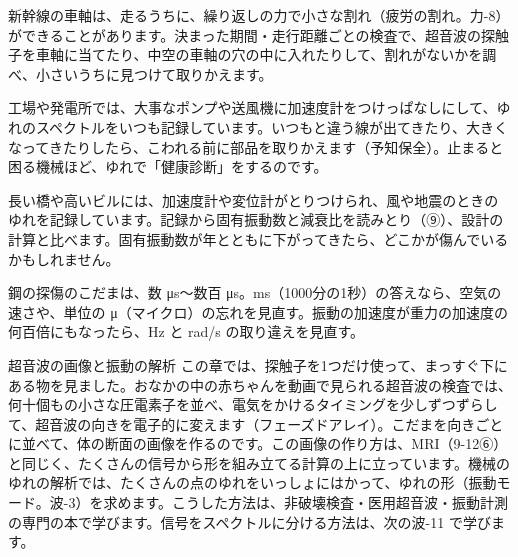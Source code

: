 \begin{phkougaku}
新幹線の車軸は、走るうちに、繰り返しの力で小さな割れ（疲労の割れ。力-8）ができることがあります。決まった期間・走行距離ごとの検査で、超音波の探触子を車軸に当てたり、中空の車軸の穴の中に入れたりして、割れがないかを調べ、小さいうちに見つけて取りかえます。

工場や発電所では、大事なポンプや送風機に加速度計をつけっぱなしにして、ゆれのスペクトルをいつも記録しています。いつもと違う線が出てきたり、大きくなってきたりしたら、こわれる前に部品を取りかえます（予知保全）。止まると困る機械ほど、ゆれで「健康診断」をするのです。

長い橋や高いビルには、加速度計や変位計がとりつけられ、風や地震のときのゆれを記録しています。記録から固有振動数と減衰比を読みとり（⑨）、設計の計算と比べます。固有振動数が年とともに下がってきたら、どこかが傷んでいるかもしれません。
\begin{phketa}[超音波と振動の数の目安]
鋼の探傷のこだまは、数 \si{\micro s}〜数百 \si{\micro s}。ms（1000分の1秒）の答えなら、空気の速さや、単位の μ（マイクロ）の忘れを見直す。振動の加速度が重力の加速度の何百倍にもなったら、Hz と rad/s の取り違えを見直す。
\end{phketa}
\end{phkougaku}

\begin{phsaki}{超音波の画像と振動の解析}
この章では、探触子を1つだけ使って、まっすぐ下にある物を見ました。おなかの中の赤ちゃんを動画で見られる超音波の検査では、何十個もの小さな圧電素子を並べ、電気をかけるタイミングを少しずつずらして、超音波の向きを電子的に変えます（フェーズドアレイ）。こだまを向きごとに並べて、体の断面の画像を作るのです。この画像の作り方は、MRI（9-12⑥）と同じく、たくさんの信号から形を組み立てる計算の上に立っています。機械のゆれの解析では、たくさんの点のゆれをいっしょにはかって、ゆれの形（振動モード。波-3）を求めます。こうした方法は、非破壊検査・医用超音波・振動計測の専門の本で学びます。信号をスペクトルに分ける方法は、次の波-11 で学びます。
\end{phsaki}

